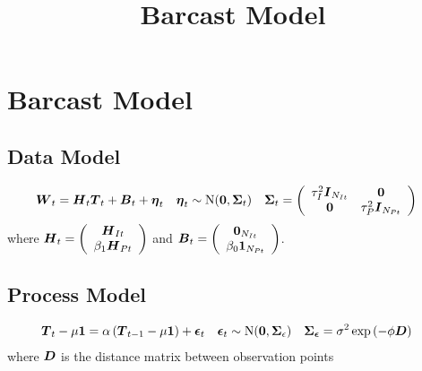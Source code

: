 \documentclass{article}\usepackage[]{graphicx}\usepackage[]{color}
\title{Barcast Model}
\def\bm#1{\mbox{\boldmath $#1$}}
\begin{document}
\maketitle
%
%
\section{Barcast Model}
%
%
\subsection{Data Model}
%
\begin{align*}
%
\bm{W}_t & = \bm{H}_t \bm{T}_t + \bm{B}_t + \bm{\eta}_t & \bm{\eta}_t & \sim \mbox{N}(\bm{0}, \bm{\Sigma}_t) & \bm{\Sigma}_t & = \left( \begin{array}{cc} \tau_I^2 \bm{I}_{N_{It}} & \bm{0}\\ \bm{0} & \tau_P^2 \bm{I}_{N_{Pt}} \end{array} \right)
%
\end{align*}
%
where $\bm{H}_t = \left( \begin{array}{c} \bm{H}_{It}\\ \beta_1 \bm{H}_{Pt} \end{array} \right)$ and $\bm{B}_t = \left( \begin{array}{c} \bm{0}_{N_{It}}\\ \beta_0 \bm{1}_{N_{Pt}} \end{array} \right)$.
%
%
\subsection{Process Model}
%
\begin{align*}
\bm{T}_t - \mu \bm{1} & = \alpha \left( \bm{T}_{t - 1} - \mu \bm{1} \right) + \bm{\epsilon}_t  & \bm{\epsilon}_t & \sim \mbox{N}(\bm{0}, \bm{\Sigma}_\epsilon) & \bm{\Sigma_\epsilon} & = \sigma^2 \exp{\left( - \phi \bm{D} \right)}
\end{align*}
%
where $\bm{D}$ is the distance matrix between observation points
%
%
\end{document}
